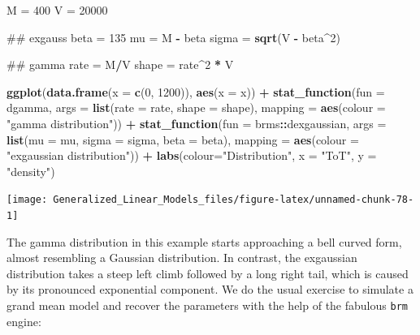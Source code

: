 \documentclass[]{svmono}
\newenvironment{Shaded}{\begin{snugshade}}{\end{snugshade}}
\newcommand{\KeywordTok}[1]{\textcolor[rgb]{0.13,0.29,0.53}{\textbf{#1}}}
\newcommand{\DataTypeTok}[1]{\textcolor[rgb]{0.13,0.29,0.53}{#1}}
\newcommand{\DecValTok}[1]{\textcolor[rgb]{0.00,0.00,0.81}{#1}}
\newcommand{\StringTok}[1]{\textcolor[rgb]{0.31,0.60,0.02}{#1}}
\newcommand{\OperatorTok}[1]{\textcolor[rgb]{0.81,0.36,0.00}{\textbf{#1}}}
\newcommand{\NormalTok}[1]{#1}
\begin{document}
\begin{Shaded}
\begin{Highlighting}[]
\NormalTok{M =}\StringTok{ }\DecValTok{400}
\NormalTok{V =}\StringTok{ }\DecValTok{20000}

\NormalTok{## exgauss}
\NormalTok{beta =}\StringTok{ }\DecValTok{135}
\NormalTok{mu =}\StringTok{ }\NormalTok{M }\OperatorTok{-}\StringTok{ }\NormalTok{beta}
\NormalTok{sigma =}\StringTok{ }\KeywordTok{sqrt}\NormalTok{(V }\OperatorTok{-}\StringTok{ }\NormalTok{beta}\OperatorTok{^}\DecValTok{2}\NormalTok{)}

\NormalTok{## gamma}
\NormalTok{rate =}\StringTok{ }\NormalTok{M}\OperatorTok{/}\NormalTok{V}
\NormalTok{shape =}\StringTok{ }\NormalTok{rate}\OperatorTok{^}\DecValTok{2} \OperatorTok{*}\StringTok{ }\NormalTok{V}

\KeywordTok{ggplot}\NormalTok{(}\KeywordTok{data.frame}\NormalTok{(}\DataTypeTok{x =} \KeywordTok{c}\NormalTok{(}\DecValTok{0}\NormalTok{, }\DecValTok{1200}\NormalTok{)), }\KeywordTok{aes}\NormalTok{(}\DataTypeTok{x =}\NormalTok{ x)) }\OperatorTok{+}
\StringTok{  }\KeywordTok{stat_function}\NormalTok{(}\DataTypeTok{fun =}\NormalTok{ dgamma, }
                \DataTypeTok{args =} \KeywordTok{list}\NormalTok{(}\DataTypeTok{rate =}\NormalTok{ rate, }\DataTypeTok{shape =}\NormalTok{ shape), }
                \DataTypeTok{mapping =} \KeywordTok{aes}\NormalTok{(}\DataTypeTok{colour =} \StringTok{"gamma distribution"}\NormalTok{)) }\OperatorTok{+}
\StringTok{  }\KeywordTok{stat_function}\NormalTok{(}\DataTypeTok{fun =}\NormalTok{ brms}\OperatorTok{::}\NormalTok{dexgaussian, }
                \DataTypeTok{args =} \KeywordTok{list}\NormalTok{(}\DataTypeTok{mu =}\NormalTok{ mu, }
                            \DataTypeTok{sigma =}\NormalTok{ sigma,}
                            \DataTypeTok{beta =}\NormalTok{ beta), }
                \DataTypeTok{mapping =} \KeywordTok{aes}\NormalTok{(}\DataTypeTok{colour =} \StringTok{"exgaussian distribution"}\NormalTok{)) }\OperatorTok{+}
\StringTok{  }\KeywordTok{labs}\NormalTok{(}\DataTypeTok{colour=}\StringTok{"Distribution"}\NormalTok{, }\DataTypeTok{x =} \StringTok{"ToT"}\NormalTok{, }\DataTypeTok{y =} \StringTok{"density"}\NormalTok{)}
\end{Highlighting}
\end{Shaded}

\texttt{[image: Generalized\_Linear\_Models\_files/figure-latex/unnamed-chunk-78-1]}

The gamma distribution in this example starts approaching a bell curved
form, almost resembling a Gaussian distribution. In contrast, the
exgaussian distribution takes a steep left climb followed by a long
right tail, which is caused by its pronounced exponential component. We
do the usual exercise to simulate a grand mean model and recover the
parameters with the help of the fabulous \texttt{brm} engine:
\end{document}
